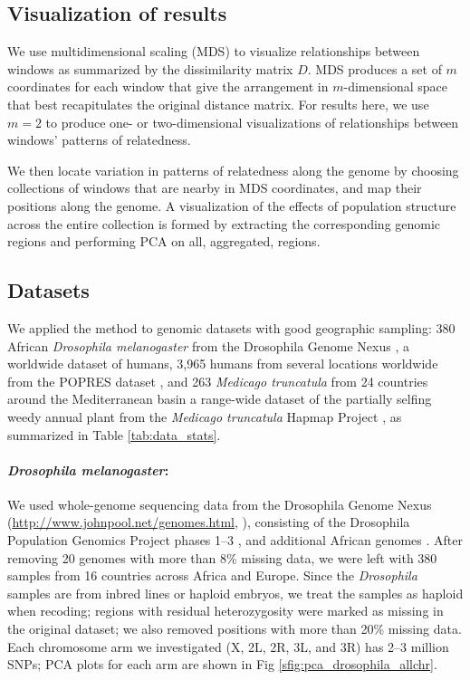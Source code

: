 \documentclass[11pt, oneside]{article}   	%
\newcommand\citep{\cite}
\newcommand{\Figure}{Fig }
\newcommand{\Figure}{{Figure }}
\begin{document}
\subsection{Visualization of results}

We use multidimensional scaling (MDS) to visualize relationships between windows
as summarized by the dissimilarity matrix $D$.
MDS produces a set of $m$ coordinates for each window that
give the arrangement in $m$-dimensional space that best recapitulates the original distance matrix.
For results here, we use $m=2$ to produce one- or two-dimensional visualizations of relationships between windows' patterns of relatedness.

We then locate variation in patterns of relatedness along the genome
by choosing collections of windows that are nearby in MDS coordinates,
and map their positions along the genome.
A visualization of the effects of population structure across the entire collection is formed by extracting the corresponding genomic regions
and performing PCA on all, aggregated, regions.



\subsection{Datasets}

We applied the method to genomic datasets with good geographic sampling:
380 African \textit{Drosophila melanogaster} from the Drosophila Genome Nexus \citep{lack2015drosophila},
a worldwide dataset of humans,
3,965 humans from several locations worldwide from the POPRES dataset \citep{nelson2008population},
and 263 \textit{Medicago truncatula} from 24 countries around the Mediterranean basin 
a range-wide dataset of the partially selfing weedy annual plant 
from the \textit{Medicago truncatula} Hapmap Project \citep{tang2014improved},
as summarized in Table \ref{tab:data_stats}.

\paragraph{\textit{Drosophila melanogaster}:}
We used whole-genome sequencing data 
from the Drosophila Genome Nexus (\url{http://www.johnpool.net/genomes.html}, \citep{lack2015drosophila}),
consisting of the Drosophila Population Genomics Project phases 1--3 \citep{langley2012genomic,pool2012population},
and additional African genomes \citep{lack2015drosophila}.
After removing 20 genomes with more than 8\% missing data,
we were left with 380 samples from 16 countries across Africa and Europe.
Since the \textit{Drosophila} samples are from inbred lines or haploid embryos, 
we treat the samples as haploid when recoding;
regions with residual heterozygosity were marked as missing in the original dataset;
we also removed positions with more than 20\% missing data. 
Each chromosome arm we investigated (X, 2L, 2R, 3L, and 3R) has 2--3 million SNPs;
PCA plots for each arm are shown in \Figure \ref{sfig:pca_drosophila_allchr}.
\end{document}
